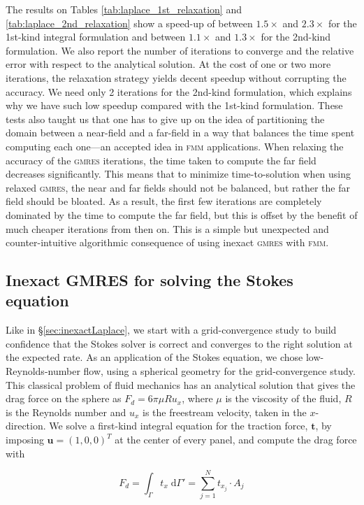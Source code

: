\documentclass[final,3p,times]{elsarticle}
\newcommand{\fmm}{\textsc{fmm}\xspace}
\newcommand{\gmres}{\textsc{gmres}\xspace}
\newcommand{\di}[1]{\text{d}#1}
\newcommand{\vect}[1]{\mathbf{#1}}
\begin{document}
The results on Tables \ref{tab:laplace_1st_relaxation} and \ref{tab:laplace_2nd_relaxation} show a speed-up of between $1.5\times$ and $2.3\times$ for the 1st-kind integral formulation and between $1.1\times$ and $1.3\times$ for the 2nd-kind formulation. We also report the number of iterations to converge and the relative error with respect to the analytical solution. At the cost of one or two more iterations, the relaxation strategy yields decent speedup without corrupting the accuracy.
We need only 2 iterations for the 2nd-kind formulation, which explains why we have such low speedup compared with the 1st-kind formulation.
These tests also taught us that one has to give up on the idea of partitioning the domain between a near-field and a far-field in a way that balances the time spent computing each one---an accepted idea in \fmm applications. When relaxing the accuracy of the \gmres iterations, the time taken to compute the far field decreases significantly. This means that to minimize time-to-solution when using relaxed \gmres, the near and far fields should not be balanced, but rather the far field should be bloated. As a result, the first few iterations are completely dominated by the time to compute the far field, but this is offset by the benefit of much cheaper iterations from then on. This is a simple but unexpected and counter-intuitive algorithmic consequence of using inexact \gmres with \fmm.


\subsection{Inexact {\small GMRES} for solving the Stokes equation}
Like in \S\ref{sec:inexactLaplace}, we start with a grid-convergence study to build confidence that the Stokes solver is correct and converges to the right solution at the expected rate. As an application of the Stokes equation, we chose low-Reynolds-number flow, using a spherical geometry for the grid-convergence study. This classical problem of fluid mechanics has an analytical solution that gives the drag force on the sphere as $F_d = 6\pi\mu Ru_x$, where $\mu$ is the viscosity of the fluid, $R$ is the Reynolds number and $u_x$ is the freestream velocity, taken in the $x$-direction. We solve a first-kind integral equation for the traction force, $\vect{t}$, by imposing $\vect{u} = (1,0,0)^{T}$ at the center of every panel, and compute the drag force with

\begin{equation}
	\label{eqn:stokes_traction_drag}
	F_d = \int_\Gamma t_x\;\di{\Gamma'} = \sum_{j=1}^{N} t_{x_j}\cdot A_j
\end{equation}
\end{document}
